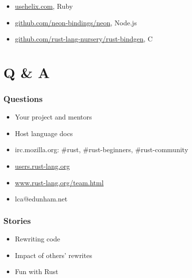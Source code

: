 \documentclass{beamer}
\begin{document}
\begin{frame}[fragile]
\tableofcontents[currentsubsection]
\end{frame}


\begin{frame}[fragile]
\frametitle{\insertsubsectionhead}

\begin{itemize}[<+(1)->]
\item \url{usehelix.com}, Ruby
\item \url{github.com/neon-bindings/neon}, Node.js
\item \url{github.com/rust-lang-nursery/rust-bindgen}, C
\end{itemize}

\end{frame}

\section{Q \& A}

\begin{frame}[fragile]
\tableofcontents [currentsection]
\end{frame}

\begin{frame}[fragile]
\frametitle{Questions}
\begin{itemize}[<+(1)->]
\item Your project and mentors
\item Host language docs
\item irc.mozilla.org: \#rust, \#rust-beginners, \#rust-community
\item \url{users.rust-lang.org}
\item \url{www.rust-lang.org/team.html}
\item lca$@$edunham.net
\end{itemize}
\end{frame}

\begin{frame}[fragile]
\frametitle{Stories}

\begin{itemize}
\item Rewriting code
\item Impact of others' rewrites
\item Fun with Rust
\end{itemize}

\end{frame}
\end{document}
